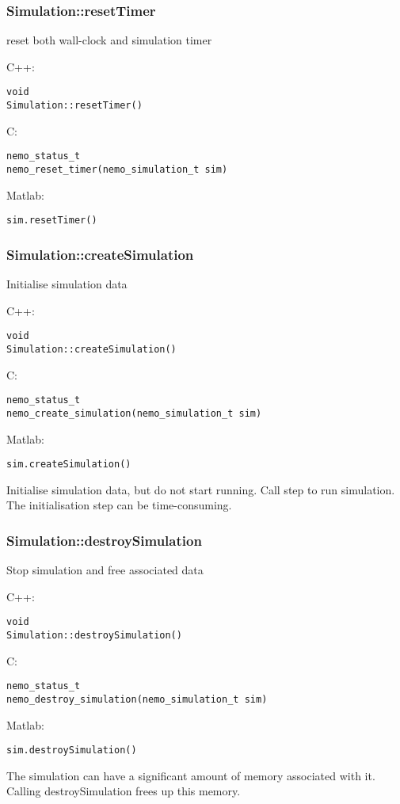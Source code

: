 \clearpage
\subsubsection*{Simulation::resetTimer}
\label{fn: resetTimer}
reset both wall-clock and simulation timer


\noindent C++:
\begin{lstlisting}[aboveskip=2pt]
void
Simulation::resetTimer()
\end{lstlisting}

\noindent C:
\begin{lstlisting}[aboveskip=2pt]
nemo_status_t
nemo_reset_timer(nemo_simulation_t sim)
\end{lstlisting}

\noindent Matlab:
\begin{lstlisting}[aboveskip=2pt]
sim.resetTimer()
\end{lstlisting}

\clearpage
\subsubsection*{Simulation::createSimulation}
\label{fn: createSimulation}
Initialise simulation data


\noindent C++:
\begin{lstlisting}[aboveskip=2pt]
void
Simulation::createSimulation()
\end{lstlisting}

\noindent C:
\begin{lstlisting}[aboveskip=2pt]
nemo_status_t
nemo_create_simulation(nemo_simulation_t sim)
\end{lstlisting}

\noindent Matlab:
\begin{lstlisting}[aboveskip=2pt]
sim.createSimulation()
\end{lstlisting}
Initialise simulation data, but do not start running. Call step to run simulation. The initialisation step can be time-consuming.

\clearpage
\subsubsection*{Simulation::destroySimulation}
\label{fn: destroySimulation}
Stop simulation and free associated data


\noindent C++:
\begin{lstlisting}[aboveskip=2pt]
void
Simulation::destroySimulation()
\end{lstlisting}

\noindent C:
\begin{lstlisting}[aboveskip=2pt]
nemo_status_t
nemo_destroy_simulation(nemo_simulation_t sim)
\end{lstlisting}

\noindent Matlab:
\begin{lstlisting}[aboveskip=2pt]
sim.destroySimulation()
\end{lstlisting}
The simulation can have a significant amount of memory associated with it. Calling destroySimulation frees up this memory.

\clearpage